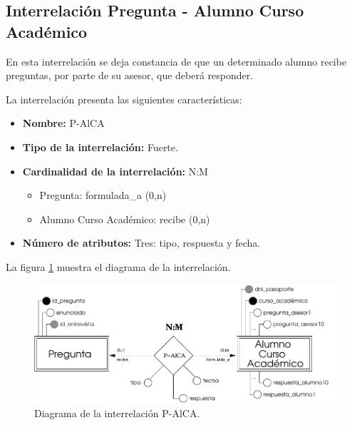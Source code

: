 \subsection{Interrelación Pregunta - Alumno Curso Académico}

   \begin{description}
      \item[Definición] En esta interrelación se deja constancia de que un
      determinado alumno recibe preguntas, por parte de su asesor, que deberá
      responder.

      \item[Características] La interrelación presenta las siguientes
                             características:

         \begin{itemize}
            \item \textbf{Nombre:} P-AlCA
            \item \textbf{Tipo de la interrelación:} Fuerte.
            \item \textbf{Cardinalidad de la interrelación:} N:M
                  \begin{itemize}
                     \item Pregunta: formulada\_a (0,n)
                     \item Alumno Curso Académico: recibe (0,n)
                  \end{itemize}
            \item \textbf{Número de atributos:} Tres: tipo, respuesta y fecha.
         \end{itemize}

      \item[Diagrama] La figura \ref{diagramaP-AlCA} muestra el diagrama de la
                      interrelación.

      \item \begin{figure}[!ht]
            \begin{center}
            \includegraphics[]{07.Modelo_Entidad-Interrelacion/7.3.Analisis_Interrelaciones/diagramas/P-AlCA.pdf}
            \caption{Diagrama de la interrelación P-AlCA.}
            \label{diagramaP-AlCA}
            \end{center}
         \end{figure}


\end{description}
